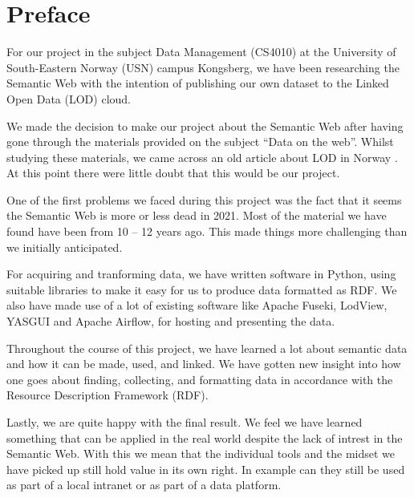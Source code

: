 \chapter*{Preface}

For our project in the subject Data Management (CS4010) at the University of South-Eastern Norway (USN) campus Kongsberg, we have been researching the Semantic Web with the intention of publishing our own dataset to the Linked Open Data (LOD) cloud.

\vspace{5mm}


We made the decision to make our project about the Semantic Web after having gone through the materials provided on the subject “Data on the web”. Whilst studying these materials, we came across an old article about LOD in Norway \cite{semicolon_slutt}. At this point there were little doubt that this would be our project.

\vspace{5mm}

One of the first problems we faced during this project was the fact that it seems the Semantic Web is more or less dead in 2021. Most of the material we have found have been from 10 – 12 years ago. This made things more challenging than we initially anticipated. 

\vspace{5mm}

For acquiring and tranforming data, we have written software in Python, using suitable libraries to make it easy for us to produce data formatted as RDF. We also have made use of a lot of existing software like Apache Fuseki, LodView, YASGUI and Apache Airflow, for hosting and presenting the data.

\vspace{5mm}

Throughout the course of this project, we have learned a lot about semantic data and how it can be made, used, and linked. We have gotten new insight into how one goes about finding, collecting, and formatting data in accordance with the  Resource Description Framework (RDF).

\vspace{5mm}

Lastly, we are quite happy with the final result. We feel we have learned something that can be applied in the real world despite the lack of intrest in the Semantic Web. With this we mean that the individual tools and the midset we have picked up still hold value in its own right. In example can they still be used as part of a local intranet or as part of a data platform.



